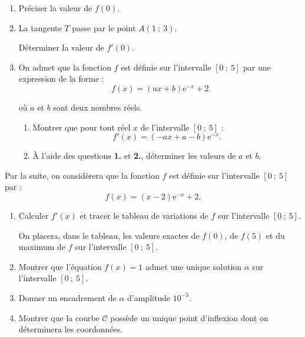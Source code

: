 \begin{enumerate}
     \item
     Préciser la valeur de $f(0)$.
     \item
     La tangente $T$ passe par le point $A(1~;~3)$.
     \par
     Déterminer la valeur de $f'(0)$.
     \item
     On admet que la fonction $f$ est définie sur l'intervalle $[0~;~5]$ par une expression de la forme :
     \[ f(x)=(ax+b)\text{e}^{-x}+2 \]
     \par
     où $a$ et $b$ sont deux nombres réels.
     \par
     \begin{enumerate}
          \item
          Montrer que pour tout réel $x$ de l'intervalle $[0~;~5]$ :
          \[ f'(x)=(-ax+a-b)\text{e}^{-x}. \]
          \item
          \`A l'aide des questions \textbf{1.} et \textbf{2.}, déterminer les valeurs de $a$ et $b$.
          \par
     \end{enumerate}
     \par
\end{enumerate}
\par
%
%
\par
Par la suite, on considèrera que la fonction $f$ est définie sur l'intervalle $[0~;~5]$ par :
\[ f(x)=(x-2)\text{e}^{-x}+2. \]
\par
\begin{enumerate}
     \item
     Calculer $f'(x)$ et tracer le tableau de variations de $f$ sur l'intervalle $[0~;~5]$.
     \par
     On placera, dans le tableau, les valeurs exactes de $f(0)$, de $f(5)$ et du maximum de $f$ sur l'intervalle $[0~;~5]$.
     \item
     Montrer que l'équation $f(x)=1$ admet une unique solution $\alpha$ sur l'intervalle $[0~;~5]$.
     \item
     Donner un encadrement de $\alpha$ d'amplitude $10^{-3}$.
     \item
     Montrer que la courbe $\mathscr{C}$ possède un unique point d'inflexion dont on déterminera les coordonnées.
     \par
\end{enumerate}
